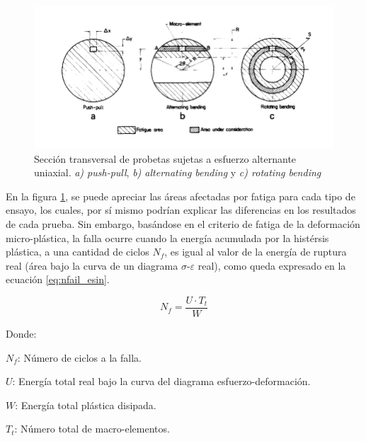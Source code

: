 \begin{figure}[h]
\centering
\includegraphics[scale=1]{Imagenes/affectedarea_fatigue.pdf}
\caption{Sección transversal de probetas sujetas a esfuerzo alternante uniaxial. \textit{a) push-pull}, \textit{b) alternating bending} y \textit{c) rotating bending}}
\label{fig:affar_fat}
\end{figure}


En la figura \ref{fig:affar_fat}, se puede apreciar las áreas afectadas por fatiga para cada tipo de ensayo, los cuales, por sí mismo podrían explicar las diferencias en los resultados de cada prueba. Sin embargo, basándose en el criterio de fatiga de la deformación micro-plástica, la falla ocurre cuando la energía acumulada por la histérsis plástica, a una cantidad de ciclos $N_f$, es igual al valor de la energía de ruptura real (área bajo la curva de un diagrama $\sigma$-$\varepsilon$ real), como queda expresado en la ecuación \ref{eq:nfail_esin}.

\begin{equation}\label{eq:nfail_esin}
	N_f = \frac{U \cdot T_t}{W} 
\end{equation}

Donde:
\begin{itemize*}
	\item $N_f$: Número de ciclos a la falla.
	\item $U$: Energía total real bajo la curva del diagrama esfuerzo-deformación.
	\item $W$: Energía total plástica disipada.
	\item $T_t$: Número total de macro-elementos.
\end{itemize*}

